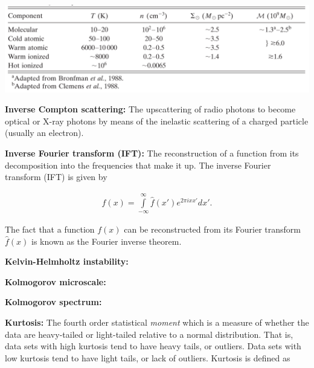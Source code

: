 \documentclass[a4paper,10pt]{article}
\begin{document}
\begin{table}[h]
\begin{center}
 \label{table:ismphases}
\includegraphics[width=15cm]{figures/ISMphases.png}
\end{center}
\end{table}

{\noindent}\textbf{Inverse Compton scattering:} The upscattering of radio photons to become optical or X-ray photons by means of the inelastic scattering of a charged particle (usually an electron).

{\noindent}\textbf{Inverse Fourier transform (IFT):} The reconstruction of a function from its decomposition into the frequencies that make it up. The inverse Fourier transform (IFT) is given by

\begin{align*}
    f(x) = \int\limits_{-\infty}^\infty \hat{f}(x')e^{2\pi ixx'}dx'.
\end{align*}

{\noindent}The fact that a function $f(x)$ can be reconstructed from its Fourier transform $\hat{f}(x)$ is known as the Fourier inverse theorem.

{\noindent}\textbf{Kelvin-Helmholtz instability:}

{\noindent}\textbf{Kolmogorov microscale:}

{\noindent}\textbf{Kolmogorov spectrum:}

{\noindent}\textbf{Kurtosis:} The fourth order statistical \textit{moment} which is a measure of whether the data are heavy-tailed or light-tailed relative to a normal distribution. That is, data sets with high kurtosis tend to have heavy tails, or outliers. Data sets with low kurtosis tend to have light tails, or lack of outliers. Kurtosis is defined as
\end{document}
